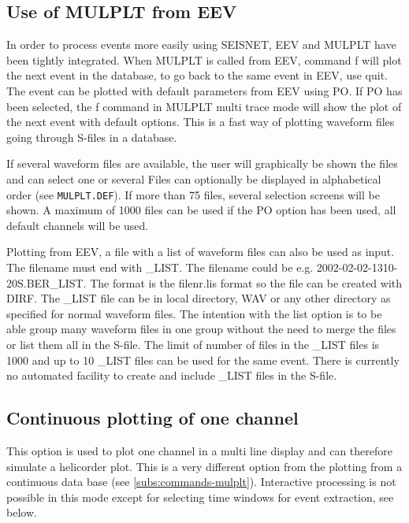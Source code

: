 \subsection{Use of MULPLT from EEV}

In order to process events more easily using SEISNET, EEV and MULPLT have been tightly integrated. When MULPLT is called from EEV, command f will plot the next event in the database, to go back to the same event in EEV, use quit. The event can be plotted with default parameters from EEV using PO. If PO has been selected, the f command in MULPLT multi trace mode will show the plot of the next event with default options. This is a fast way of plotting waveform files going through S-files in a database. 

If several waveform files are available, the user will graphically be shown the files and can select one or several Files can optionally be displayed in alphabetical order (see \texttt{MULPLT.DEF}). If more than 75 files, several selection screens will be shown. A maximum of 1000 files can be used if the PO option has been used, all default channels will be used. 

Plotting from EEV, a file with a list of waveform files can also be used as input. The filename must end with \_LIST.  The filename could be e.g. 2002-02-02-1310-20S.BER\_LIST. The format is the filenr.lis format so the file can be created with DIRF.  The \_LIST file can be in local directory, WAV or any other directory as specified for normal waveform files.  The intention with the list option is to be able group many waveform files in one group without the need to merge the files or list them all in the S-file. The limit of number of files in the \_LIST files is 1000 and up to 10 \_LIST files can be used for the same event. There is currently no automated facility to create and include \_LIST files in the S-file.




\subsection{Continuous plotting of one channel}

This option is used to plot one channel in a multi line display and can therefore simulate a helicorder plot. This is a very different option from the plotting from a continuous data base (see \ref{subs:commands-mulplt}).  Interactive processing is not possible in this mode except for selecting time windows for event extraction, see below. 


